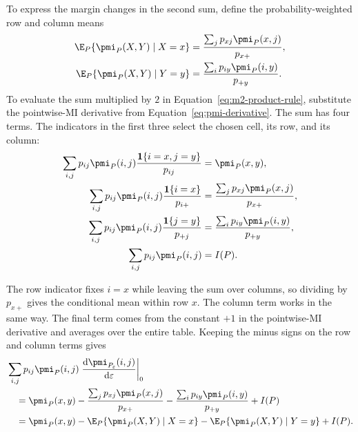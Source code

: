 To express the margin changes in the second sum, define the
probability-weighted row and column means
\begin{align}
  \E_P\{\pmi_P(X,Y)\mid X=x\}
  &=\frac{\sum_j p_{xj}\pmi_P(x,j)}{p_{x+}},\\
  \E_P\{\pmi_P(X,Y)\mid Y=y\}
  &=\frac{\sum_i p_{iy}\pmi_P(i,y)}{p_{+y}}.
\end{align}
To evaluate the sum multiplied by \(2\) in
Equation~\eqref{eq:m2-product-rule}, substitute the pointwise-MI derivative
from Equation~\eqref{eq:pmi-derivative}. The sum has four terms. The
indicators in the first three select the chosen cell, its row, and its column:
\begin{align*}
  \sum_{i,j}p_{ij}\pmi_P(i,j)
  \frac{\mathbf 1\{i=x,j=y\}}{p_{ij}}
  &=\pmi_P(x,y),\\
  \sum_{i,j}p_{ij}\pmi_P(i,j)
  \frac{\mathbf 1\{i=x\}}{p_{i+}}
  &=\frac{\sum_j p_{xj}\pmi_P(x,j)}{p_{x+}},\\
  \sum_{i,j}p_{ij}\pmi_P(i,j)
  \frac{\mathbf 1\{j=y\}}{p_{+j}}
  &=\frac{\sum_i p_{iy}\pmi_P(i,y)}{p_{+y}},\\
  \sum_{i,j}p_{ij}\pmi_P(i,j)&=I(P).
\end{align*}
\begin{samepage}%
The row indicator fixes \(i=x\) while leaving the sum over columns, so
dividing by \(p_{x+}\) gives the conditional mean within row \(x\). The column
term works in the same way. The final term comes from the constant \(+1\)
in the pointwise-MI derivative and averages over the entire table. Keeping
the minus signs on the row and column terms gives
\begin{align}
  &\sum_{i,j}p_{ij}\pmi_P(i,j)
  \left.\frac{\mathrm d\pmi_{P_\varepsilon}(i,j)}
  {\mathrm d\varepsilon}\right|_{0}
  \notag\\
  &\quad=
  \pmi_P(x,y)
  -\frac{\sum_j p_{xj}\pmi_P(x,j)}{p_{x+}}
  -\frac{\sum_i p_{iy}\pmi_P(i,y)}{p_{+y}}
  +I(P)
  \notag\\
  &\quad=
  \pmi_P(x,y)
  -\E_P\{\pmi_P(X,Y)\mid X=x\}
  -\E_P\{\pmi_P(X,Y)\mid Y=y\}
  +I(P).
  \label{eq:m2-score-term}
\end{align}
\par
\end{samepage}

